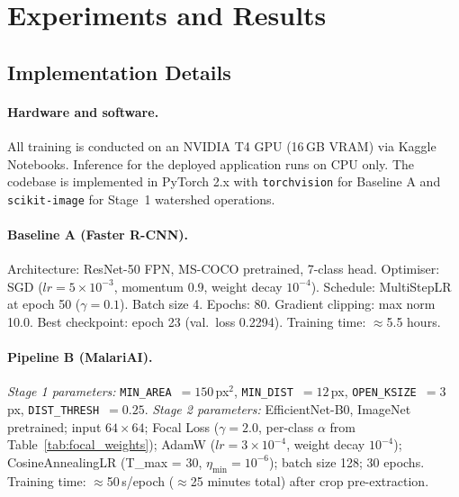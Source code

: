 \documentclass[10pt,twocolumn]{article}
\begin{document}
\section{Experiments and Results}
\label{sec:experiments}

\subsection{Implementation Details}
\label{ssec:impl}

\paragraph{Hardware and software.}
All training is conducted on an NVIDIA T4 GPU (16\,GB VRAM) via Kaggle
Notebooks. Inference for the deployed application runs on CPU only.
The codebase is implemented in PyTorch 2.x with \texttt{torchvision} for
Baseline A and \texttt{scikit-image} for Stage~1 watershed operations.

\paragraph{Baseline A (Faster R-CNN).}
Architecture: ResNet-50 FPN, MS-COCO pretrained, 7-class head. Optimiser:
SGD ($lr = 5 \times 10^{-3}$, momentum 0.9, weight decay $10^{-4}$).
Schedule: MultiStepLR at epoch 50 ($\gamma = 0.1$). Batch size 4. Epochs:
80. Gradient clipping: max norm 10.0. Best checkpoint: epoch 23
(val.\ loss 0.2294). Training time: $\approx$5.5 hours.

\paragraph{Pipeline B (MalariAI).}
\textit{Stage 1 parameters:} \texttt{MIN\_AREA}~$= 150$\,px$^2$,
\texttt{MIN\_DIST}~$= 12$\,px, \texttt{OPEN\_KSIZE}~$= 3$\,px,
\texttt{DIST\_THRESH}~$= 0.25$.
\textit{Stage 2 parameters:} EfficientNet-B0, ImageNet pretrained; input
$64\times 64$; Focal Loss ($\gamma = 2.0$, per-class $\alpha$ from
Table~\ref{tab:focal_weights}); AdamW ($lr = 3 \times 10^{-4}$,
weight decay $10^{-4}$); CosineAnnealingLR (T\_max = 30,
$\eta_{\min} = 10^{-6}$); batch size 128; 30 epochs. Training time:
$\approx$50\,s/epoch ($\approx$25 minutes total) after crop pre-extraction.
\end{document}
